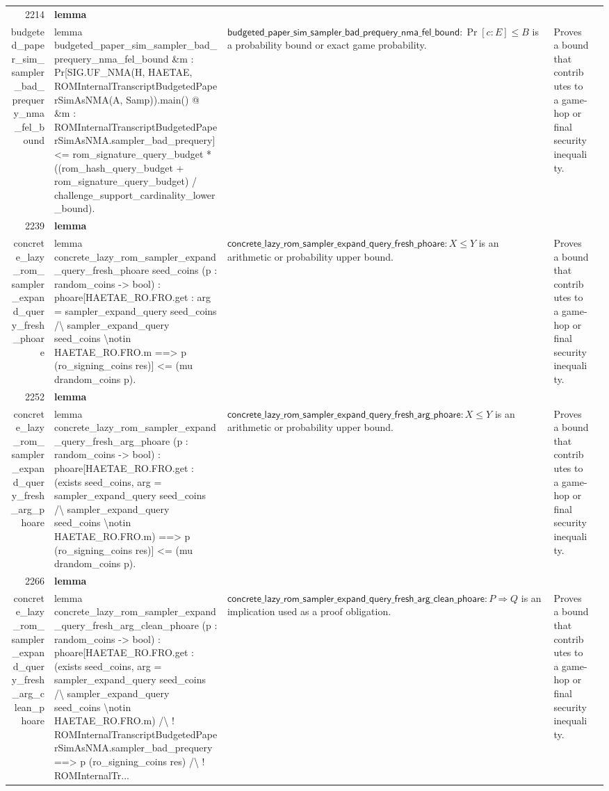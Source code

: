 \documentclass[10pt]{article}
\newcommand{\ec}[1]{\begingroup\ttfamily\scriptsize #1\endgroup}
\begin{document}
\begin{longtable}{r L{0.17\textwidth} L{0.26\textwidth} L{0.27\textwidth} L{0.20\textwidth}}
2214 & \textbf{lemma}\\\ec{budgeted\_paper\_sim\_sampler\_bad\_prequery\_nma\_fel\_bound} & \ec{lemma budgeted\_paper\_sim\_sampler\_bad\_prequery\_nma\_fel\_bound \&m : Pr[SIG.UF\_NMA(H, HAETAE, ROMInternalTranscriptBudgetedPaperSimAsNMA(A, Samp)).main() @ \&m : ROMInternalTranscriptBudgetedPaperSimAsNMA.sampler\_bad\_prequery] <= rom\_signature\_query\_budget * ((rom\_hash\_query\_budget + rom\_signature\_query\_budget) / challenge\_support\_cardinality\_lower\_bound).} & \(\mathsf{budgeted\_paper\_sim\_sampler\_bad\_prequery\_nma\_fel\_bound} : \Pr[c : E] \le B\) is a probability bound or exact game probability. & Proves a bound that contributes to a game-hop or final security inequality. \\
2239 & \textbf{lemma}\\\ec{concrete\_lazy\_rom\_sampler\_expand\_query\_fresh\_phoare} & \ec{lemma concrete\_lazy\_rom\_sampler\_expand\_query\_fresh\_phoare seed\_coins (p : random\_coins -> bool) : phoare[HAETAE\_RO.FRO.get : arg = sampler\_expand\_query seed\_coins /\textbackslash{} sampler\_expand\_query seed\_coins \textbackslash{}notin HAETAE\_RO.FRO.m ==> p (ro\_signing\_coins res)] <= (mu drandom\_coins p).} & \(\mathsf{concrete\_lazy\_rom\_sampler\_expand\_query\_fresh\_phoare} : X \le Y\) is an arithmetic or probability upper bound. & Proves a bound that contributes to a game-hop or final security inequality. \\
2252 & \textbf{lemma}\\\ec{concrete\_lazy\_rom\_sampler\_expand\_query\_fresh\_arg\_phoare} & \ec{lemma concrete\_lazy\_rom\_sampler\_expand\_query\_fresh\_arg\_phoare (p : random\_coins -> bool) : phoare[HAETAE\_RO.FRO.get : (exists seed\_coins, arg = sampler\_expand\_query seed\_coins /\textbackslash{} sampler\_expand\_query seed\_coins \textbackslash{}notin HAETAE\_RO.FRO.m) ==> p (ro\_signing\_coins res)] <= (mu drandom\_coins p).} & \(\mathsf{concrete\_lazy\_rom\_sampler\_expand\_query\_fresh\_arg\_phoare} : X \le Y\) is an arithmetic or probability upper bound. & Proves a bound that contributes to a game-hop or final security inequality. \\
2266 & \textbf{lemma}\\\ec{concrete\_lazy\_rom\_sampler\_expand\_query\_fresh\_arg\_clean\_phoare} & \ec{lemma concrete\_lazy\_rom\_sampler\_expand\_query\_fresh\_arg\_clean\_phoare (p : random\_coins -> bool) : phoare[HAETAE\_RO.FRO.get : (exists seed\_coins, arg = sampler\_expand\_query seed\_coins /\textbackslash{} sampler\_expand\_query seed\_coins \textbackslash{}notin HAETAE\_RO.FRO.m) /\textbackslash{} ! ROMInternalTranscriptBudgetedPaperSimAsNMA.sampler\_bad\_prequery ==> p (ro\_signing\_coins res) /\textbackslash{} ! ROMInternalTr...} & \(\mathsf{concrete\_lazy\_rom\_sampler\_expand\_query\_fresh\_arg\_clean\_phoare} : P \Rightarrow Q\) is an implication used as a proof obligation. & Proves a bound that contributes to a game-hop or final security inequality. \\

\end{longtable}
\end{document}
